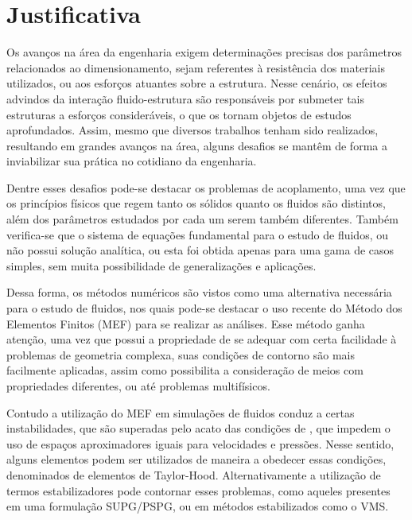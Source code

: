 \section{Justificativa}

Os avanços na área da engenharia exigem determinações precisas dos parâmetros relacionados ao dimensionamento, sejam referentes à resistência dos materiais utilizados, ou aos esforços atuantes sobre a estrutura. Nesse cenário, os efeitos advindos da interação fluido-estrutura são responsáveis por submeter tais estruturas a esforços consideráveis, o que os tornam objetos de estudos aprofundados. Assim, mesmo que diversos trabalhos tenham sido realizados, resultando em grandes avanços na área, alguns desafios se mantêm de forma a inviabilizar sua prática no cotidiano da engenharia.

Dentre esses desafios pode-se destacar os problemas de acoplamento, uma vez que os princípios físicos que regem tanto os sólidos quanto os fluidos são distintos, além dos parâmetros estudados por cada um serem também diferentes. Também verifica-se que o sistema de equações fundamental para o estudo de fluidos, ou não possui solução analítica, ou esta foi obtida apenas para uma gama de casos simples, sem muita possibilidade de generalizações e aplicações.

Dessa forma, os métodos numéricos são vistos como uma alternativa necessária para o estudo de fluidos, nos quais pode-se destacar o uso recente do Método dos Elementos Finitos (MEF) para se realizar as análises. Esse método ganha atenção, uma vez que possui a propriedade de se adequar com certa facilidade à problemas de geometria complexa, suas condições de contorno são mais facilmente aplicadas, assim como possibilita a consideração de meios com propriedades diferentes, ou até problemas multifísicos.

Contudo a utilização do MEF em simulações de fluidos conduz a certas instabilidades, que são superadas pelo acato das condições de \LBB, que impedem o uso de espaços aproximadores iguais para velocidades e pressões. Nesse sentido, alguns elementos podem ser utilizados de maneira a obedecer essas condições, denominados de elementos de Taylor-Hood. Alternativamente a utilização de termos estabilizadores pode contornar esses problemas, como aqueles presentes em uma formulação SUPG/PSPG, ou em métodos estabilizados como o VMS.

